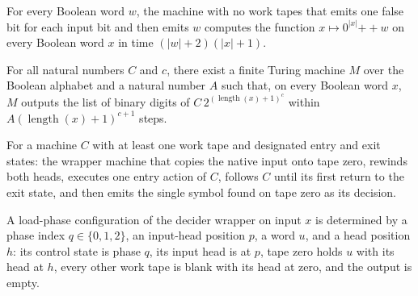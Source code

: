 \begin{lemma}
\label{Complexity.a3_shift_timed}
\leanok
{}
For every Boolean word $w$, the machine with no work tapes that emits one false bit for
each input bit and then emits $w$ computes the function $x \mapsto 0^{|x|}
\mathbin{+\!\!+} w$ on every Boolean word $x$ in time $(|w|+2)(|x|+1)$.
\end{lemma}

\begin{lemma}
\label{Complexity.a3_exp_bits_timed}
\leanok
{}
For all natural numbers $C$ and $c$, there exist a finite Turing machine $M$ over the
Boolean alphabet and a natural number $A$ such that, on every Boolean word $x$, $M$
outputs the list of binary digits of $C\,2^{(\operatorname{length}(x)+1)^c}$ within
$A(\operatorname{length}(x)+1)^{c+1}$ steps.
\end{lemma}

\begin{definition}
\label{Complexity.a3RunTM}
\leanok
{}
For a machine $C$ with at least one work tape and designated entry and exit
states: the wrapper machine that copies the native input onto tape zero, rewinds
both heads, executes one entry action of $C$, follows $C$ until its first return
to the exit state, and then emits the single symbol found on tape zero as its
decision.
\end{definition}

\begin{definition}
\label{Complexity.a3LoadCfg}
\leanok
{}
A load-phase configuration of the decider wrapper on input $x$ is determined by a
phase index $q \in \{0, 1, 2\}$, an input-head position $p$, a word $u$, and a head
position $h$: its control state is phase $q$, its input head is at $p$, tape zero
holds $u$ with its head at $h$, every other work tape is blank with its head at
zero, and the output is empty.
\end{definition}

